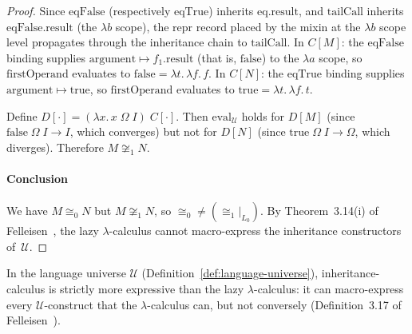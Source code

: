 \begin{proof}
  Since $\mathrm{eqFalse}$ (respectively $\mathrm{eqTrue}$)
  inherits $\mathrm{eq}.\mathrm{result}$,
  and $\mathrm{tailCall}$ inherits
  $\mathrm{eqFalse}.\mathrm{result}$ (the $\lambda b$
  scope), the $\mathrm{repr}$ record placed by the mixin
  at the $\lambda b$ scope level propagates through
  the inheritance chain to $\mathrm{tailCall}$.
  In $C[M]$: the $\mathrm{eqFalse}$ binding supplies
  $\mathrm{argument} \mapsto f_1.\mathrm{result}$
  (that is, $\mathrm{false}$) to the $\lambda a$ scope, so
  $\mathrm{firstOperand}$ evaluates to
  $\mathrm{false} = \lambda t.\,\lambda f.\, f$.
  In $C[N]$: the $\mathrm{eqTrue}$ binding supplies
  $\mathrm{argument} \mapsto \mathrm{true}$, so
  $\mathrm{firstOperand}$ evaluates to
  $\mathrm{true} = \lambda t.\,\lambda f.\, t$.

  Define $D[\cdot] = (\lambda x.\, x\;\Omega\;I)\;
  C[\cdot]$.
  Then $\mathrm{eval}_{\mathscr{U}}$ holds for $D[M]$
  (since $\mathrm{false}\;\Omega\;I \to I$, which
  converges)
  but not for $D[N]$
  (since $\mathrm{true}\;\Omega\;I \to \Omega$, which
  diverges).
  Therefore $M \not\cong_1 N$.

  \paragraph{Conclusion}
  We have $M \cong_0 N$ but $M \not\cong_1 N$, so
  ${\cong_0} \neq {(\cong_1|_{L_0})}$.
  By Theorem~3.14(i) of
  Felleisen~\cite{felleisen1991-expressive-power},
  the lazy $\lambda$-calculus cannot macro-express the
  inheritance constructors of~$\mathscr{U}$.
\end{proof}

\begin{theorem}
  \label{thm:expressive-asymmetry}
  In the language universe $\mathscr{U}$
  (Definition~\ref{def:language-universe}),
  inheritance-calculus is strictly more expressive than
  the lazy $\lambda$-calculus: it can macro-express every
  $\mathscr{U}$-construct that the $\lambda$-calculus
  can, but not conversely
  (Definition~3.17 of
  Felleisen~\cite{felleisen1991-expressive-power}).
\end{theorem}


